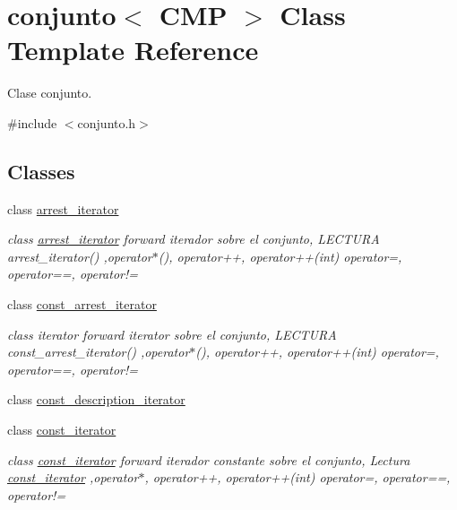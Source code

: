\hypertarget{classconjunto}{}\section{conjunto$<$ C\+M\+P $>$ Class Template Reference}
\label{classconjunto}


Clase conjunto.  




{\ttfamily \#include $<$conjunto.\+h$>$}

\subsection*{Classes}
\begin{DoxyCompactItemize}
\item 
class \hyperlink{classconjunto_1_1arrest__iterator}{arrest\+\_\+iterator}
\begin{DoxyCompactList}\small\item\em class \hyperlink{classconjunto_1_1arrest__iterator}{arrest\+\_\+iterator} forward iterador sobre el conjunto, L\+E\+C\+T\+U\+R\+A arrest\+\_\+iterator() ,operator$\ast$(), operator++, operator++(int) operator=, operator==, operator!= \end{DoxyCompactList}\item 
class \hyperlink{classconjunto_1_1const__arrest__iterator}{const\+\_\+arrest\+\_\+iterator}
\begin{DoxyCompactList}\small\item\em class iterator forward iterator sobre el conjunto, L\+E\+C\+T\+U\+R\+A const\+\_\+arrest\+\_\+iterator() ,operator$\ast$(), operator++, operator++(int) operator=, operator==, operator!= \end{DoxyCompactList}\item 
class \hyperlink{classconjunto_1_1const__description__iterator}{const\+\_\+description\+\_\+iterator}
\item 
class \hyperlink{classconjunto_1_1const__iterator}{const\+\_\+iterator}
\begin{DoxyCompactList}\small\item\em class \hyperlink{classconjunto_1_1const__iterator}{const\+\_\+iterator} forward iterador constante sobre el conjunto, Lectura \hyperlink{classconjunto_1_1const__iterator}{const\+\_\+iterator} ,operator$\ast$, operator++, operator++(int) operator=, operator==, operator!= \end{DoxyCompactList}\item 

\end{DoxyCompactItemize}
